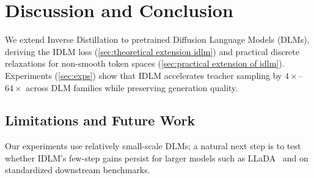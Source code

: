 \color{debugcolor}
\section{Discussion and Conclusion}
\label{sec:conclusion}
    We extend Inverse Distillation to pretrained Diffusion Language Models (DLMs), deriving the IDLM loss (\wasyparagraph\ref{sec:theoretical extension idlm}) and practical discrete relaxations for non-smooth token spaces (\wasyparagraph\ref{sec:practical extension of idlm}). Experiments (\wasyparagraph\ref{sec:exps}) show that IDLM accelerates teacher sampling by $4\times$--$64\times$ across DLM families while preserving generation quality.
\subsection{Limitations and Future Work}
\label{sec:limitations}
    Our experiments use relatively small-scale DLMs; a natural next step is to test whether IDLM's few-step gains persist for larger models such as LLaDA~\citep{nie2025large} and on standardized downstream benchmarks.
\color{black}
